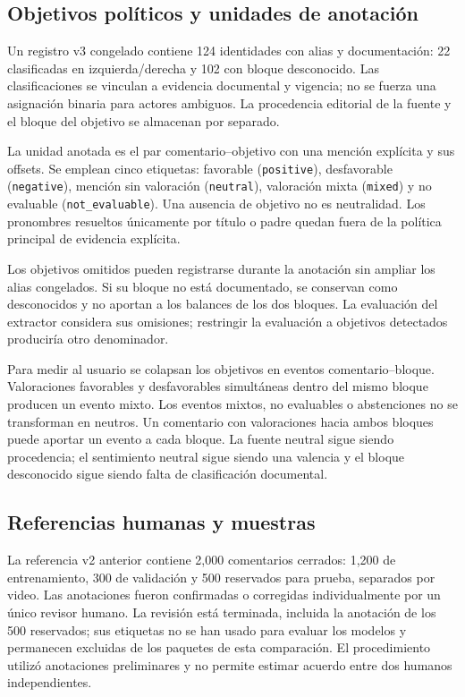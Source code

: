 \documentclass[conference,letterpaper]{IEEEtran}
\begin{document}
\subsection{Objetivos políticos y unidades de anotación}
Un registro v3 congelado contiene 124 identidades con alias y documentación: 22 clasificadas en izquierda/derecha y 102 con bloque desconocido. Las clasificaciones se vinculan a evidencia documental y vigencia; no se fuerza una asignación binaria para actores ambiguos. La procedencia editorial de la fuente y el bloque del objetivo se almacenan por separado.

La unidad anotada es el par comentario--objetivo con una mención explícita y sus offsets. Se emplean cinco etiquetas: favorable (\texttt{positive}), desfavorable (\texttt{negative}), mención sin valoración (\texttt{neutral}), valoración mixta (\texttt{mixed}) y no evaluable (\texttt{not\_evaluable}). Una ausencia de objetivo no es neutralidad. Los pronombres resueltos únicamente por título o padre quedan fuera de la política principal de evidencia explícita.

Los objetivos omitidos pueden registrarse durante la anotación sin ampliar los alias congelados. Si su bloque no está documentado, se conservan como desconocidos y no aportan a los balances de los dos bloques. La evaluación del extractor considera sus omisiones; restringir la evaluación a objetivos detectados produciría otro denominador.

Para medir al usuario se colapsan los objetivos en eventos comentario--bloque. Valoraciones favorables y desfavorables simultáneas dentro del mismo bloque producen un evento mixto. Los eventos mixtos, no evaluables o abstenciones no se transforman en neutros. Un comentario con valoraciones hacia ambos bloques puede aportar un evento a cada bloque. La fuente neutral sigue siendo procedencia; el sentimiento neutral sigue siendo una valencia y el bloque desconocido sigue siendo falta de clasificación documental.

\subsection{Referencias humanas y muestras}
La referencia v2 anterior contiene 2,000 comentarios cerrados: 1,200 de entrenamiento, 300 de validación y 500 reservados para prueba, separados por video. Las anotaciones fueron confirmadas o corregidas individualmente por un único revisor humano. La revisión está terminada, incluida la anotación de los 500 reservados; sus etiquetas no se han usado para evaluar los modelos y permanecen excluidas de los paquetes de esta comparación. El procedimiento utilizó anotaciones preliminares y no permite estimar acuerdo entre dos humanos independientes.
\end{document}
